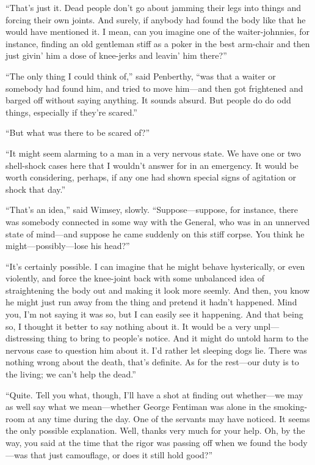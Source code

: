 \enquote{That's just it. Dead people don't go about jamming their legs into things and forcing their own joints. And surely, if anybody had found the body like that he would have mentioned it. I mean, can you imagine one of the waiter-johnnies, for instance, finding an old gentleman stiff as a poker in the best arm-chair and then just givin' him a dose of knee-jerks and leavin' him there?}

\enquote{The only thing I could think of,} said Penberthy, \enquote{was that a waiter or somebody had found him, and tried to move him\allowbreak---\allowbreak and then got frightened and barged off without saying anything. It sounds absurd. But people do do odd things, especially if they're scared.}

\enquote{But what was there to be scared of?}

\enquote{It might seem alarming to a man in a very nervous state. We have one or two shell-shock cases here that I wouldn't answer for in an emergency. It would be worth considering, perhaps, if any one had shown special signs of agitation or shock that day.}

\enquote{That's an idea,} said Wimsey, slowly. \enquote{Suppose\allowbreak---\allowbreak suppose, for instance, there was somebody connected in some way with the General, who was in an unnerved state of mind\allowbreak---\allowbreak and suppose he came suddenly on this stiff corpse. You think he might\allowbreak---\allowbreak possibly---lose his head?}

\enquote{It's certainly possible. I can imagine that he might behave hysterically, or even violently, and force the knee-joint back with some unbalanced idea of straightening the body out and making it look more seemly. And then, you know he might just run away from the thing and pretend it hadn't happened. Mind you, I'm not saying it was so, but I can easily see it happening. And that being so, I thought it better to say nothing about it. It would be a very unpl\allowbreak---\allowbreak distressing thing to bring to people's notice. And it might do untold harm to the nervous case to question him about it. I'd rather let sleeping dogs lie. There was nothing wrong about the death, that's definite. As for the rest\allowbreak---\allowbreak our duty is to the living; we can't help the dead.}

\enquote{Quite. Tell you what, though, I'll have a shot at finding out whether\allowbreak---\allowbreak we may as well say what we mean\allowbreak---\allowbreak whether George Fentiman was alone in the smoking-room at any time during the day. One of the servants may have noticed. It seems the only possible explanation. Well, thanks very much for your help. Oh, by the way, you said at the time that the rigor was passing off when we found the body\allowbreak---\allowbreak was that just camouflage, or does it still hold good?}

